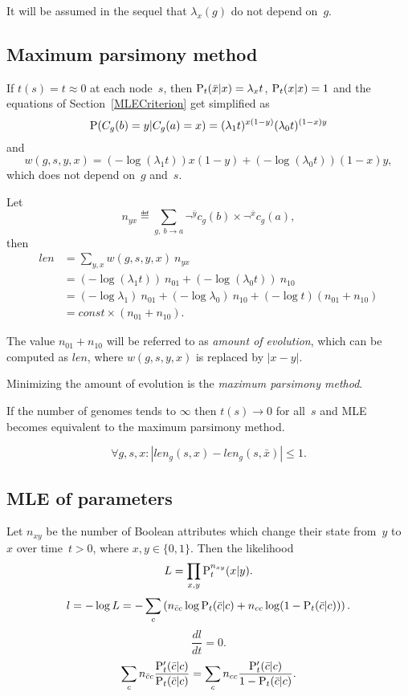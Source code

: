 \documentclass[10pt,a4paper]{article}
\theoremstyle{plain} \newtheorem{Lem}{Lemma}
\begin{document}
It will be assumed in the sequel that $\lambda_x(g)$ do not depend on~$g$.


\subsection {Maximum parsimony method}

If $t(s) = t \approx 0$ at each node~$s$,
then $ \P_t(\bar x|x) = \lambda_x t$, $ \P_t(x|x) = 1$
and the equations of Section~\ref{MLECriterion} get simplified as
$$ \P(C_g(b)=y|C_g(a)=x) = (\lambda_1 t)^{x (1-y)} (\lambda_0 t)^{(1-x) y} $$
and
$$ w(g,s,y,x) = (- \log (\lambda_1 t)) x (1-y) + (- \log (\lambda_0 t)) (1-x) y, $$
which does not depend on~$g$ and~$s $.

Let
$$ n_{yx} \eqdef \sum_{g, \ b \to a}  \neg^{\bar y} c_g(b) \times \neg^{\bar x} c_g(a), $$
then 
\begin{equation*} 
\begin{split}
 len &= \sum_{y,x} w(g,s,y,x) \ n_{yx} \\
     &= (- \log (\lambda_1 t)) \ n_{01} + (- \log (\lambda_0 t)) \ n_{10}  \\
     &= (-\log \lambda_1) \ n_{01} + (- \log \lambda_0) \ n_{10} + (- \log t) (n_{01} + n_{10}) \\
     &= const \times (n_{01} + n_{10}).
\end{split}
\end{equation*}

The value $n_{01} + n_{10}$ will be referred to as {\em amount of evolution},
which can be computed as $len$, where $w(g,s,y,x)$ is replaced by $|x - y|$.

Minimizing the amount of evolution is the {\em maximum parsimony method}.

If the number of genomes tends to $\infty$ then $t(s) \to 0$ for all~$s$ and MLE becomes equivalent to the maximum parsimony method.

$$ \forall g,s,x : |len_g (s,x) - len_g(s,\bar x)| \le 1. $$



\subsection {MLE of parameters}
Let $n_{xy}$ be the number of Boolean attributes which change their state from~$y$ to~$x$ over time~$t > 0$, where $x,y \in \{0,1\}$.
Then the likelihood
$$ L = \prod_{x,y} \P_t^{n_{xy}}(x|y). $$
$$ l = - \log L = - \sum_c \left(   n_{\bar c c} \log      \P_t(\bar c|c) 
                                  + n_{     c c} \log (1 - \P_t(\bar c|c)) \right). $$
$$ \frac {d l} {d t} = 0. $$
\begin{equation} \label{t_mle}
\sum_c n_{\bar c c} \frac {\P'_t(\bar c|c)} {\P_t(\bar c|c)} = \sum_c n_{c c} \frac {\P'_t(\bar c|c)} {1 - \P_t(\bar c|c)}. 
\end{equation}
\end{document}
